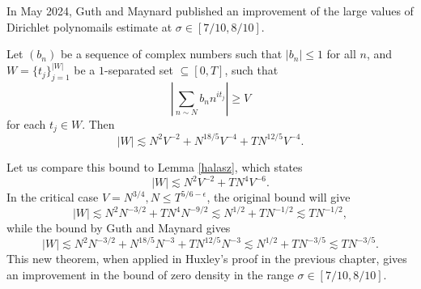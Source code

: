 In May 2024, Guth and Maynard published an improvement of the large values of Dirichlet polynomails estimate at $\sigma\in[7/10,8/10]$.
\begin{theorem}
    Let $(b_n)$ be a sequence of complex numbers such that $|b_n|\leq 1$ for all $n$, and $W=\{t_j\}_{j=1}^{|W|}$ be a $1$-separated set $\subseteq [0,T]$, such that \[
    \left|\sum_{n\sim N}b_n n^{it_j}\right|\geq V
    \]
    for each $t_j\in W$. Then \[
    |W|\lesssim N^2V^{-2}+N^{18/5}V^{-4}+TN^{12/5}V^{-4}.
    \]
\end{theorem}
Let us compare this bound to Lemma \ref{halasz}, which states \[
|W|\lesssim N^2V^{-2}+TN^4V^{-6}.
\]
In the critical case $V=N^{3/4}, N\leq T^{5/6-\epsilon}$, the original bound will give \[
|W|\lesssim N^2N^{-3/2}+TN^4N^{-9/2}\lesssim N^{1/2}+ TN^{-1/2}\lesssim TN^{-1/2},
\]
while the bound by Guth and Maynard gives \[
|W|\lesssim N^2N^{-3/2}+N^{18/5}N^{-3}+TN^{12/5}N^{-3}\lesssim N^{1/2}+TN^{-3/5}\lesssim TN^{-3/5}.
\]
This new theorem, when applied in Huxley's proof in the previous chapter, gives an improvement in the bound of zero density in the range $\sigma\in[7/10,8/10]$.
